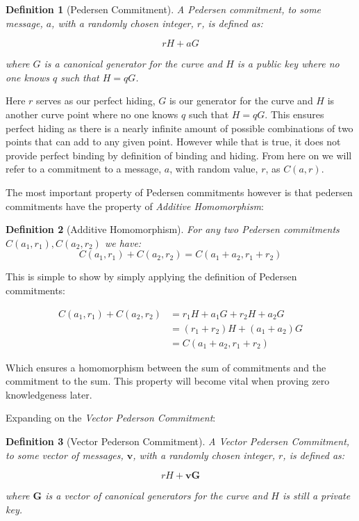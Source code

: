 \documentclass{article}
\newtheorem{definition}{Definition}[section]
\newcommand{\eq}[1]{\begin{equation*}\begin{split}#1\end{split}\end{equation*}}
\begin{document}
\begin{definition}[Pedersen Commitment]
	A Pedersen commitment, to some message, $a$, with a randomly chosen
	integer, $r$, is defined as:

	$$rH + aG$$

	where $G$ is a canonical generator for the curve and $H$ is a public
	key where no one knows $q$ such that $H = qG$.
\end{definition}

Here $r$ serves as our perfect hiding, $G$ is our generator for the
curve and $H$ is another curve point where no one knows $q$ such that
$H = qG$. This ensures perfect hiding as there is a nearly infinite
amount of possible combinations of two points that can add to any given
point. However while that is true, it does not provide perfect binding by
definition of binding and hiding. From here on we will refer to a
commitment to a message, $a$, with random value, $r$, as $C(a,r)$.

The most important property of Pedersen commitments however is
that pedersen commitments have the property of \textit{Additive
Homomorphism}:

\begin{definition}[Additive Homomorphism]
	For any two Pedersen commitments $C(a_1,r_1), C(a_2,r_2)$ we have:
	$$ C(a_1,r_1) + C(a_2,r_2) = C(a_1 + a_2, r_1 + r_2)$$
\end{definition}

This is simple to show by simply applying the definition of Pedersen
commitments: 

\eq{
	C(a_1,r_1) + C(a_2,r_2) &= r_1H + a_1G  + r_2H + a_2G \\
	                        &= (r_1 + r_2)H + (a_1 + a_2)G \\
	                        &= C(a_1+a_2,r_1+r_2)
}

Which ensures a homomorphism between the sum of commitments and the
commitment to the sum. This property will become vital when proving zero
knowledgeness later. 

Expanding on the \textit{Vector Pederson Commitment}:
\begin{definition}[Vector Pederson Commitment]
	A Vector Pedersen Commitment, to some vector of messages,
	$\textbf{v}$, with a randomly chosen integer, $r$,
	is defined as:

	$$rH + \textbf{vG}$$

	where $\textbf{G}$ is a vector of canonical generators for
	the curve and $H$ is still a private key.
\end{definition}
\end{document}

